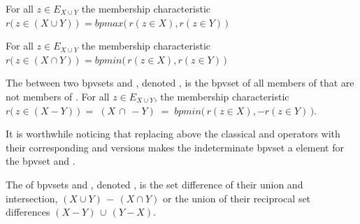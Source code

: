 \documentclass[a4paper,12pt,english]{sphinxhowto}
\begin{document}
\begin{DUlineblock}{0em}
\item[] For all \(z \in E_{X \cup Y}\) the membership characteristic \(r\big(\,z \in (X \cup Y)\,\big)\; = bpmax \big(\,r(z \in X),r(z \in Y)\, \big)\)
\end{DUlineblock}

\begin{DUlineblock}{0em}
\item[] For all \(z \in E_{X \cup Y}\) the membership characteristic \(r\big(\,z \in (X \cap Y)\,\big)\; = bpmin \big(\,r(z \in X),r(z \in Y)\, \big)\)
\end{DUlineblock}

\begin{DUlineblock}{0em}
\item[] The  between two bpv\sphinxhyphen{}sets  and , denoted , is the bpv\sphinxhyphen{}set of all members of  that are not members of . For all \(z \in E_{X \cup Y}\), the membership characteristic \(r\big(\,z \in (X - Y)\, \big)\; = \; (X \,\cap\, -Y) \; = \; bpmin\big(\,r(z \in X),-r(z \in Y)\,\big)\).
\end{DUlineblock}

\sphinxAtStartPar
It is worthwhile noticing that replacing above the classical  and  operators with their corresponding  and  versions makes the indeterminate bpv\sphinxhyphen{}set a  element for the bpv\sphinxhyphen{}set  and .

\sphinxAtStartPar
The  of bpv\sphinxhyphen{}sets  and , denoted , is the set difference of their union and intersection, \((X \cup Y) \,-\, (X \cap Y)\) or the union of their reciprocal set differences \((X - Y) \,\cup\, (Y - X)\).
\end{document}

